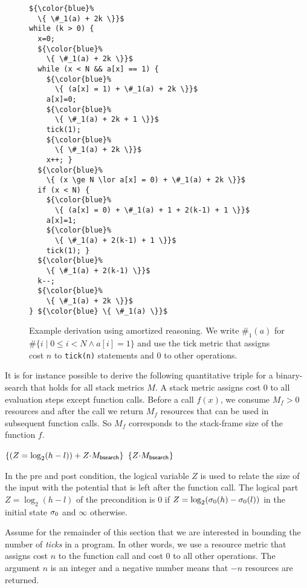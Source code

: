 \documentclass[nocopyrightspace,preprint]{sigplanconf}
\begin{document}
\begin{figure}
\center
\begin{minipage}[b]{0.8\linewidth}
\begin{lstlisting}
${\color{blue}%
  \{ \#_1(a) + 2k \}}$
while (k > 0) {
  x=0;
  ${\color{blue}%
    \{ \#_1(a) + 2k \}}$
  while (x < N && a[x] == 1) {
    ${\color{blue}%
      \{ (a[x] = 1) + \#_1(a) + 2k \}}$
    a[x]=0;
    ${\color{blue}%
      \{ \#_1(a) + 2k + 1 \}}$
    tick(1);
    ${\color{blue}%
      \{ \#_1(a) + 2k \}}$
    x++; }
  ${\color{blue}%
    \{ (x \ge N \lor a[x] = 0) + \#_1(a) + 2k \}}$
  if (x < N) {
    ${\color{blue}%
      \{ (a[x] = 0) + \#_1(a) + 1 + 2(k-1) + 1 \}}$
    a[x]=1;
    ${\color{blue}%
      \{ \#_1(a) + 2(k-1) + 1 \}}$
    tick(1); }
  ${\color{blue}%
    \{ \#_1(a) + 2(k-1) \}}$
  k--;
  ${\color{blue}%
    \{ \#_1(a) + 2k \}}$
} ${\color{blue} \{ \#_1(a) \}}$

\end{lstlisting}
\end{minipage}

\caption{Example derivation using amortized reasoning.  We write
  $\#_1(a)$ for $\# \{ i \mid 0 \le i < N \land a[i] = 1 \}$ and use the
  tick metric that assigns cost $n$ to \lstinline{tick(n)} statements and
  0 to other operations.
  }
\label{fig:xmplinc}
\end{figure}




It is for instance possible to derive the following quantitative
triple for a binary-search that holds for all stack metrics $M$.  A
stack metric assigns cost $0$ to all evaluation steps except function
calls.  Before a call $f(x)$, we consume $M_f > 0$ resources and
after the call we return $M_f$ resources that can be used in
subsequent function calls.  So $M_f$ corresponds to the stack-frame
size of the function $f$.
%
\begin{center}
${ \{ (Z = \log_2(h-l)) + Z{\cdot}M_{\mathsf{bsearch}} \} }$
${ \{ Z{\cdot}M_{\mathsf{bsearch}} \} }$
  
\end{center}
%
In the pre and post condition, the logical variable $Z$ is used to
relate the size of the input with the potential that is left after the
function call.  The logical part $Z = \log_2(h-l)$ of the precondition
is $0$ if $Z = \log_2(\sigma_0(h)-\sigma_0(l))$ in the initial state
$\sigma_0$ and $\infty$ otherwise.

Assume for the remainder of this section that we are interested in
bounding the number of \emph{ticks} in a program.  In other words, we
use a resource metric that assigns cost $n$ to the function call
 and cost $0$ to all other operations.  The argument $n$
is an integer and a negative number means that $-n$ resources are
returned.
\end{document}
